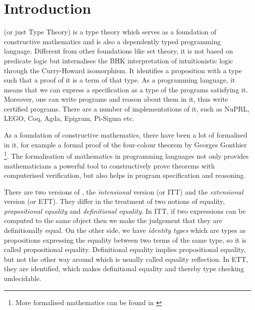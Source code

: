 \chapter{Introduction}

\mltt (or just Type Theory) is a type theory which serves as a foundation of constructive mathematics and is also a dependently typed programming language. Different from other foundations like set theory, it is not based on predicate logic but internalises the BHK interpretation of intuitionistic logic through the Curry-Howard isomorphism. It identifies a proposition with a type such that a proof of it is a term of that type. 
As a programming language, it means that we can express a specification as a type of the programs satisfying it.
Moreover, one can write programs and reason about them in it, thus write certified programs. There are a number of implementations of it, such as NuPRL, LEGO, Coq, Agda, Epigram, Pi-Sigma etc.


As a foundation of constructive mathematics, there have been a lot of \maths formalised in it, for example a formal proof of the four-colour theorem by Georges Gonthier \cite{gonthier08ams} \footnote{More formalised mathematics can be found in \cite{sbfm}}. The formalisation of mathematics in programming languages not only provides mathematicians a powerful tool to constructively prove theorems with computerised verification, but also helps in program specification and reasoning. 

There are two versions of \mltt, the \emph{intensional} version (\itt or ITT) and the \emph{extensional} version (\ett or ETT).  They differ in the treatment of two notions of equality, \emph{propositional equality} and \emph{definitional equality}.  In ITT, if two expressions can be computed to the same object then we make the judgement that they are definitionally equal. On the other side, we have \emph{identity types} which are types as propositions expressing the equality between two terms of the same type, so it is called propositional equality. Definitional equality implies propositional equality, but not the other way around which is usually called equality reflection.
In ETT, they are identified, which makes definitional equality and thereby type checking undecidable. 


